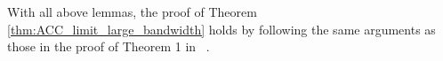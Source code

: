 
	

With all above lemmas, the proof of Theorem \ref{thm:ACC_limit_large_bandwidth} holds by following the same arguments as those in the proof of Theorem 1 in ~\cite{Li2017}.



%
%	

%